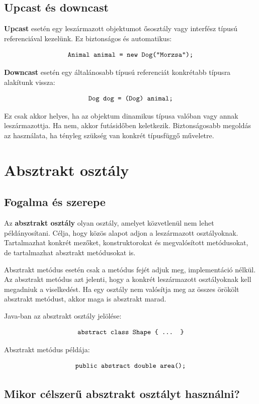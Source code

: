 \subsection{Upcast és downcast}

\textbf{Upcast} esetén egy leszármazott objektumot ősosztály vagy interfész típusú referenciával kezelünk. Ez biztonságos és automatikus:

\[
  \texttt{Animal animal = new Dog("Morzsa");}
\]

\textbf{Downcast} esetén egy általánosabb típusú referenciát konkrétabb típusra alakítunk vissza:

\[
  \texttt{Dog dog = (Dog) animal;}
\]

Ez csak akkor helyes, ha az objektum dinamikus típusa valóban  vagy annak leszármazottja. Ha nem, akkor futásidőben  keletkezik. Biztonságosabb megoldás az  használata, ha tényleg szükség van konkrét típusfüggő műveletre.

\section{Absztrakt osztály}

\subsection{Fogalma és szerepe}

Az \textbf{absztrakt osztály} olyan osztály, amelyet közvetlenül nem lehet példányosítani. Célja, hogy közös alapot adjon a leszármazott osztályoknak. Tartalmazhat konkrét mezőket, konstruktorokat és megvalósított metódusokat, de tartalmazhat absztrakt metódusokat is.

Absztrakt metódus esetén csak a metódus fejét adjuk meg, implementáció nélkül. Az absztrakt metódus azt jelenti, hogy a konkrét leszármazott osztályoknak kell megadniuk a viselkedést. Ha egy osztály nem valósítja meg az összes örökölt absztrakt metódust, akkor maga is absztrakt marad.

Java-ban az absztrakt osztály jelölése:

\[
  \texttt{abstract class Shape \{ ... \}}
\]

Absztrakt metódus példája:

\[
  \texttt{public abstract double area();}
\]

\subsection{Mikor célszerű absztrakt osztályt használni?}


